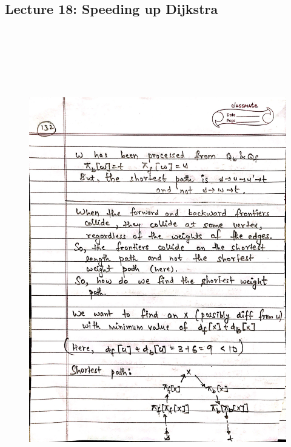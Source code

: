 \newpage
{\color{black} \subsection*{Lecture 18: Speeding up Dijkstra}}
\begin{figure}[H]
    \centering
    \includegraphics[width=16cm, height=21cm]{"./MIT-6.006/MIT-6006-132"}
\end{figure}

